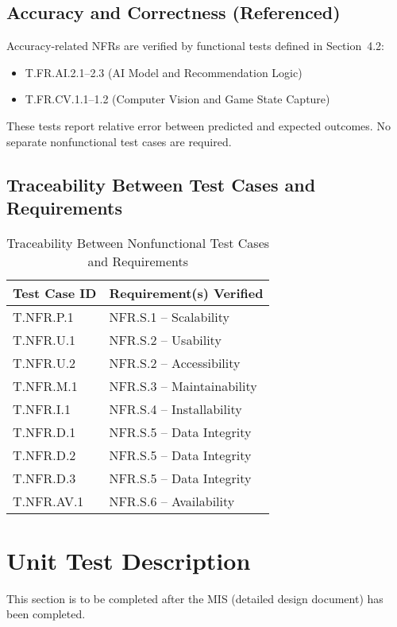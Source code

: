 \documentclass[12pt, titlepage]{article}
\begin{document}
\subsection{Accuracy and Correctness (Referenced)}

Accuracy-related NFRs are verified by functional tests defined in Section~4.2:
\begin{itemize}
    \item T.FR.AI.2.1--2.3 (AI Model and Recommendation Logic)
    \item T.FR.CV.1.1--1.2 (Computer Vision and Game State Capture)
\end{itemize}
These tests report relative error between predicted and expected outcomes. No separate nonfunctional test cases are required.

\subsection{Traceability Between Test Cases and Requirements }

\begin{table}[H]
  \centering
  \caption{Traceability Between Nonfunctional Test Cases and Requirements}
  \label{tab:system-test-traceability}
  \begin{tabular}{|l|l|}
    \hline
    \textbf{Test Case ID} & \textbf{Requirement(s) Verified} \\ \hline
    T.NFR.P.1   & NFR.S.1 -- Scalability \\ \hline
    T.NFR.U.1   & NFR.S.2 -- Usability \\ \hline
    T.NFR.U.2   & NFR.S.2 -- Accessibility \\ \hline
    T.NFR.M.1   & NFR.S.3 -- Maintainability \\ \hline
    T.NFR.I.1   & NFR.S.4 -- Installability \\ \hline
    T.NFR.D.1   & NFR.S.5 -- Data Integrity \\ \hline
    T.NFR.D.2   & NFR.S.5 -- Data Integrity \\ \hline
    T.NFR.D.3   & NFR.S.5 -- Data Integrity \\ \hline
    T.NFR.AV.1  & NFR.S.6 -- Availability \\ \hline
  \end{tabular}
\end{table}


\section{Unit Test Description}
This section is to be completed after the MIS (detailed design document) has been completed.
\end{document}
